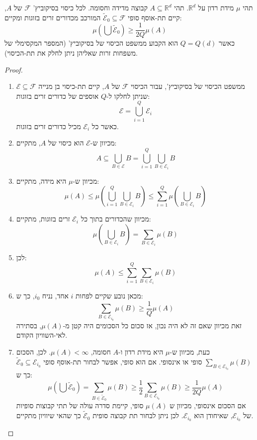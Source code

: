 \documentclass{tstextbook}
\begin{document}
\begin{proposition}
תהי \(\mu\) מידת רדון על \(\mathbb{R}^d\). תהי \(A \subseteq \mathbb{R}^d\) קבוצה מדידה וחסומה. לכל כיסוי בסיקוביץ' \(\mathcal{F}\) של \(A\), קיים תת-אוסף סופי \(\widetilde{\mathcal{E}}_0 \subseteq \mathcal{F}\) המורכב מכדורים זרים בזוגות ומקיים:
$$ \mu\left( \bigcup \widetilde{\mathcal{E}}_0 \right) \geq \frac{1}{2Q} \mu(A) $$
כאשר \(Q = Q(d)\) הוא הקבוע ממשפט הכיסוי של בסיקוביץ' (המספר המקסימלי של משפחות זרות שאליהן ניתן לחלק את תת-הכיסוי).

\end{proposition}
\begin{proof}
  \begin{enumerate}
    \item ממשפט הכיסוי של בסיקוביץ', עבור הכיסוי \(\mathcal{F}\) של \(A\), קיים תת-כיסוי בן מנייה \(\mathcal{E} \subseteq \mathcal{F}\) שניתן לחלקו ל-\(Q\) אוספים של כדורים זרים בזוגות: 
$$ \mathcal{E} = \bigcup_{i=1}^{Q} \mathcal{E}_i $$
כאשר כל \(\mathcal{E}_i\) מכיל כדורים זרים בזוגות.


    \item מכיוון ש-\(\mathcal{E}\) הוא כיסוי של \(A\), מתקיים: 
$$ A \subseteq \bigcup_{B \in \mathcal{E}} B = \bigcup_{i=1}^{Q} \bigcup_{B \in \mathcal{E}_i} B $$


    \item מכיוון ש-\(\mu\) היא מידה, מתקיים: 
$$ \mu(A) \leq \mu\left( \bigcup_{i=1}^{Q} \bigcup_{B \in \mathcal{E}_i} B \right) \leq \sum_{i=1}^{Q} \mu\left( \bigcup_{B \in \mathcal{E}_i} B \right) $$


    \item מכיוון שהכדורים בתוך כל \(\mathcal{E}_i\) זרים בזוגות, מתקיים: 
$$ \mu\left( \bigcup_{B \in \mathcal{E}_i} B \right) = \sum_{B \in \mathcal{E}_i} \mu(B) $$


    \item לכן: 
$$ \mu(A) \leq \sum_{i=1}^{Q} \sum_{B \in \mathcal{E}_i} \mu(B) $$


    \item מכאן נובע שקיים לפחות \(i\) אחד, נניח \(i_0\), כך ש: 
$$ \sum_{B \in \mathcal{E}_{i_0}} \mu(B) \geq \frac{1}{Q} \mu(A) $$
זאת מכיוון שאם זה לא היה נכון, אז סכום כל הסכומים היה קטן מ-\(\mu(A)\), בסתירה לאי-השוויון הקודם.


    \item כעת, מכיוון ש-\(\mu\) היא מידת רדון ו-\(A\) חסומה, \(\mu(A) < \infty\). לכן, הסכום \(\sum_{B \in \mathcal{E}_{i_0}} \mu(B)\) סופי או אינסופי. אם הוא סופי, אפשר לבחור תת-אוסף סופי \(\widetilde{\mathcal{E}}_0 \subseteq \mathcal{E}_{i_0}\) כך ש: 
$$ \mu\left( \bigcup \widetilde{\mathcal{E}}_0 \right) = \sum_{B \in \widetilde{\mathcal{E}}_0} \mu(B) \geq \frac{1}{2} \sum_{B \in \mathcal{E}_{i_0}} \mu(B) \geq \frac{1}{2Q} \mu(A) $$
אם הסכום אינסופי, מכיוון ש \(\mu(A)\) סופי, קיימת סדרה עולה של תתי קבוצות סופיות של \(\mathcal{E}_{i_0}\), שאיחודן הוא \(\mathcal{E}_{i_0}\). לכן ניתן לבחור תת קבוצה סופית \(\widetilde{\mathcal{E}}_0\) כך שהאי שיוויון מתקיים.


  \end{enumerate}
\end{proof}
\end{document}
